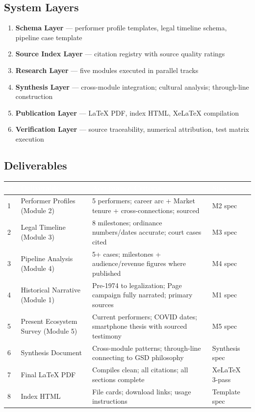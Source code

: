 \documentclass[11pt,letterpaper]{article}
\newcommand{\tableheader}[1]{\textbf{\sffamily\textcolor{white}{#1}}}
\begin{document}
\subsection{System Layers}

\begin{enumerate}[leftmargin=1.5em]
  \item \textbf{Schema Layer} --- performer profile templates, legal timeline schema, pipeline case template
  \item \textbf{Source Index Layer} --- citation registry with source quality ratings
  \item \textbf{Research Layer} --- five modules executed in parallel tracks
  \item \textbf{Synthesis Layer} --- cross-module integration; cultural analysis; through-line construction
  \item \textbf{Publication Layer} --- LaTeX PDF, index HTML, XeLaTeX compilation
  \item \textbf{Verification Layer} --- source traceability, numerical attribution, test matrix execution
\end{enumerate}

\subsection{Deliverables}

\begin{center}
\begin{tabularx}{\textwidth}{C{0.5cm}L{4cm}XC{2cm}}
\toprule
{}
\tableheader{\#} & \tableheader{Deliverable} & \tableheader{Acceptance Criteria} & \tableheader{Spec} \\
 & Performer Profiles (Module 2) & 5 performers; career arc + Market tenure + cross-connections; sourced & M2 spec \\
2 & Legal Timeline (Module 3) & 8 milestones; ordinance numbers/dates accurate; court cases cited & M3 spec \\
3 & Pipeline Analysis (Module 4) & 5+ cases; milestones + audience/revenue figures where published & M4 spec \\
4 & Historical Narrative (Module 1) & Pre-1974 to legalization; Page campaign fully narrated; primary sources & M1 spec \\
5 & Present Ecosystem Survey (Module 5) & Current performers; COVID dates; smartphone thesis with sourced testimony & M5 spec \\
6 & Synthesis Document & Cross-module patterns; through-line connecting to GSD philosophy & Synthesis spec \\
7 & Final LaTeX PDF & Compiles clean; all citations; all sections complete & XeLaTeX 3-pass \\
8 & Index HTML & File cards; download links; usage instructions & Template spec \\
\bottomrule
\end{tabularx}
\end{center}
\end{document}
